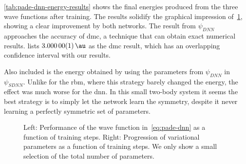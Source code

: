 \documentclass[Thesis.tex]{subfiles}
\begin{document}
\cref{tab:pade-dnn-energy-results} shows the final energies produced from the
three wave functions after training. The results solidify the graphical
impression of~\cref{fig:QD-pade-dnn-training}, showing a clear improvement by
both networks. The result from $\psi_{DNN}$ approaches the accuracy of \gls{dmc},
a technique that can obtain exact numerical results. \textcite{Pedersen-2011}
lists $\SI{3.00000(1)}{\au}$ as the \gls{dmc} result, which has an overlapping
confidence interval with our results.

Also included is the energy obtained by using the parameters from $\psi_{DNN}$
in $\psi_{SDNN}$. Unlike for the \gls{rbm}, where this strategy barely changed the
energy, the effect was much worse for the \gls{dnn}. In this small two-body
system it seems the best strategy is to simply let the network learn the
symmetry, despite it never learning a perfectly symmetric set of parameters.

\begin{figure}[h]
   \centering
    \resizebox{\linewidth}{!}{%
        
    }
    \caption[Learning progression of a neural network on quantum dots]{\label{fig:QD-pade-dnn-training}Left: Performance of the wave
function in~\cref{eq:pade-dnn} as a function of training steps. Right:
Progression of variational parameters as a function of training steps. We only
show a small selection of the total number of parameters.}
\end{figure}

\begin{table}[h]
  \centering

  \caption[Energy estimates using a neural network on quantum
  dots]{\label{tab:pade-dnn-energy-results}Energy using the neural networks
$\psi_{DNN}$ and $\psi_{SDNN}$, along with the benchmark wave function after the
same amount of optimization. $\hat\psi_{SDNN}$ shows the result of using the
parameters from $\psi_{DNN}$ with input sorting applied only after training.
Results obtained from $2^{22}$ samples and errors corrected for autocovariance by blocking. Energies in atomic units
$[\si{\au}]$. See \cref{fig:QD-pade-dnn-training} for source code reference.}
  
\end{table}

%         
\end{document}
